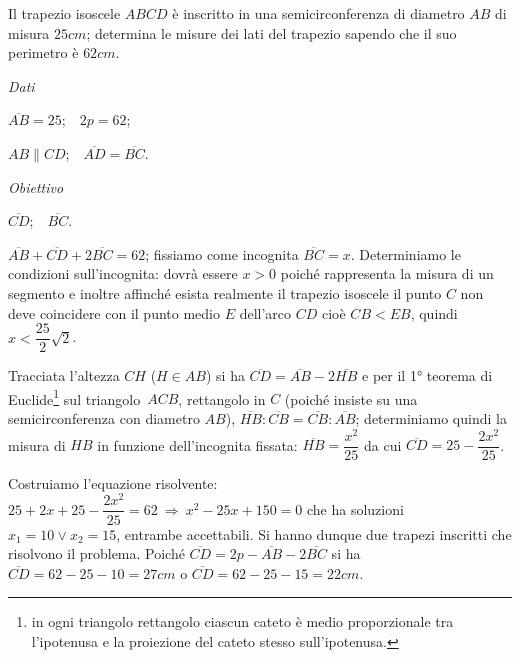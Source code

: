 \begin{problema}
Il trapezio isoscele $ABCD$ è inscritto in una semicirconferenza di diametro $AB$ di misura $25\unit{cm}$; determina le misure dei lati del trapezio sapendo che il
suo perimetro è $62\unit{cm}$.
\end{problema}

\begin{multicols}{2}
\emph{Dati}

$\overline {AB} = 25$;~~$2p = 62$;

$AB \parallel CD$;~~$\overline {AD} = \overline {BC}$.

\emph{Obiettivo}

$\overline {CD}$;~~$ \overline {BC}$.

 
\end{multicols}

\begin{soluzione}
$\overline {AB} + \overline {CD} + 2 \overline {BC} = 62$; fissiamo come incognita $\overline {BC} = x$.
Determiniamo le condizioni sull'incognita: dovrà essere $x > 0$ poiché rappresenta la misura di un segmento e inoltre affinché esista
realmente il trapezio isoscele il punto $C$ non deve coincidere con il punto medio $E$ dell'arco $CD$ cioè $ CB<EB $, quindi $x < \dfrac{25}{2} \sqrt{2}$.

Tracciata l'altezza $CH$ ($H \in AB$) si ha $\overline {CD} = \overline {AB} - 2 \overline {HB}$ e per il 1° teorema di Euclide\footnote{in ogni triangolo rettangolo ciascun cateto è medio proporzionale tra l'ipotenusa e la proiezione del cateto stesso sull'ipotenusa.} sul triangolo~$ACB$, rettangolo in
$C$ (poiché insiste su una semicirconferenza con diametro $AB$), $\overline {HB}: \overline {CB} = \overline {CB} : \overline{AB}$; determiniamo quindi la misura di $HB$ in funzione dell'incognita fissata:
$\overline {HB} = \dfrac{x^{2}}{25}$ da cui $\overline{CD} = 25 - \dfrac{2 x^{2}}{25}$.

Costruiamo l'equazione risolvente: $25 + 2 x + 25 - \dfrac{2 x^{2}}{25} = 62 \:\Rightarrow\: x^{2} - 25 x + 150 = 0$ che ha soluzioni $x_{1} = 10 \vee x_{2} = 15$, entrambe accettabili. Si hanno dunque due trapezi inscritti che risolvono il problema. Poiché $\overline{CD}= 2p-\overline{AB}-2\overline{BC}$ si ha $\overline{CD}=62-25-10=27\unit{cm}$ o $\overline{CD}=62-25-15=22\unit{cm}$.
\begin{center}
 
\end{center}
\end{soluzione}

